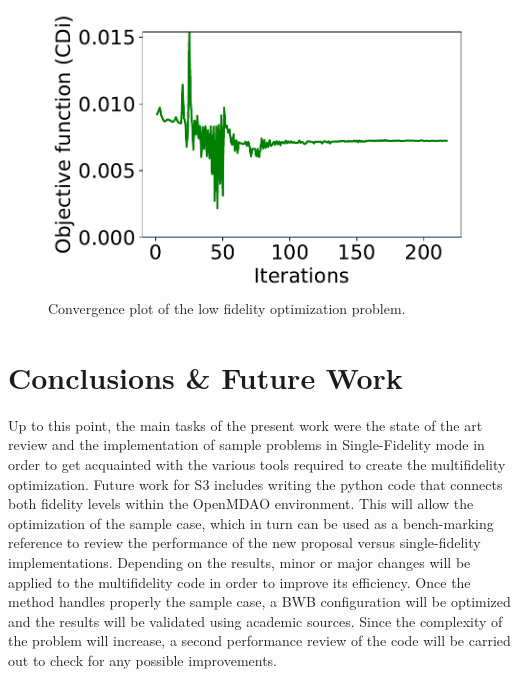 \begin{figure}[H]
    \centering
    \includegraphics[width=0.8\linewidth]{images/objective_cdi.pdf}
    \caption{Convergence plot of the low fidelity optimization problem.}
    \label{fig:conv_plot}
\end{figure}

\section{Conclusions \& Future Work}
\label{sec:conclusions}
Up to this point, the main tasks of the present work were the state of the art review and the implementation of sample problems in Single-Fidelity mode in order to get acquainted with the various tools required to create the multifidelity optimization. Future work for S3 includes writing the python code that connects both fidelity levels within the OpenMDAO environment. This will allow the optimization of the sample case, which in turn can be used as a bench-marking reference to review the performance of the new proposal versus single-fidelity implementations. Depending on the results, minor or major changes will be applied to the multifidelity code in order to improve its efficiency. Once the method handles properly the sample case, a BWB configuration will be optimized and the results will be validated using academic sources. Since the complexity of the problem will increase, a second performance review of the code will be carried out to check for any possible improvements.   